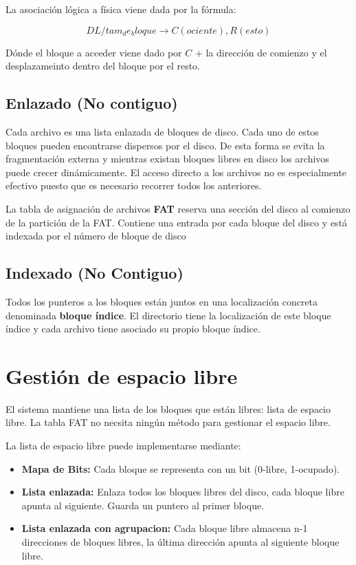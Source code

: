 La asociación lógica a física viene dada por la fórmula:

\[
	DL/tam_de_bloque \rightarrow C(ociente), R(esto)
\]

Dónde el bloque a acceder viene dado por $C$ + la dirección de comienzo y el desplazameinto dentro del bloque por el resto.

\subsection*{Enlazado (No contiguo)}
Cada archivo es una lista enlazada de bloques de disco. Cada uno de estos bloques pueden encontrarse dispersos por el disco. De esta forma se evita la fragmentación externa y mientras existan bloques libres en disco los archivos puede crecer dinámicamente. El acceso directo a los archivos no es especialmente efectivo puesto que es necesario recorrer todos los anteriores.

La tabla de asignación de archivos \textbf{FAT} reserva una sección del disco al comienzo de la partición de la FAT. Contiene una entrada por cada bloque del disco y está indexada por el número de bloque de disco

\subsection*{Indexado (No Contiguo)}
Todos los punteros a los bloques están juntos en una localización concreta denominada \textbf{bloque índice}. El directorio tiene la localización de este bloque índice y cada archivo tiene asociado su propio bloque índice.

\section*{Gestión de espacio libre}
El sistema mantiene una lista de los bloques que están libres: lista de espacio libre. La tabla FAT no necsita ningún método para gestionar el espacio libre.

La lista de espacio libre puede implementarse mediante:

\begin{itemize}
	\item\textbf{Mapa de Bits:} Cada bloque se representa con un bit (0-libre, 1-ocupado).
	\item\textbf{Lista enlazada:} Enlaza todos los bloques libres del disco, cada bloque libre apunta al siguiente. Guarda un puntero al primer bloque.
	\item\textbf{Lista enlazada con agrupacion:} Cada bloque libre almacena n-1 direcciones de bloques libres, la última dirección apunta al siguiente bloque libre.
\end{itemize}

